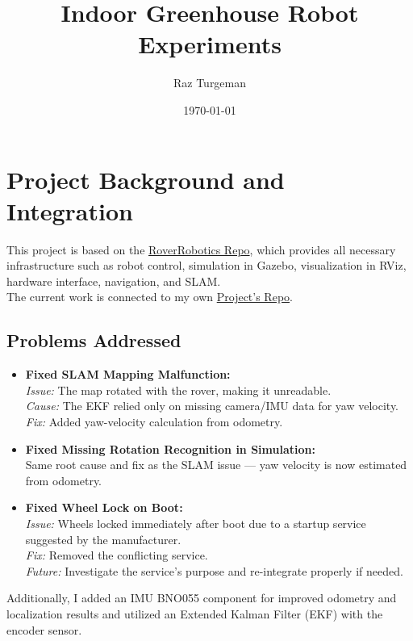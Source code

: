 \documentclass[11pt]{article}
\title{Indoor Greenhouse Robot Experiments}
\author{Raz Turgeman}
\date{\today}
\begin{document}
\maketitle

\section{Project Background and Integration}

This project is based on the \href{https://github.com/RoverRobotics/roverrobotics_ros2/tree/humble}{RoverRobotics Repo}, which provides all necessary infrastructure such as robot control, simulation in Gazebo, visualization in RViz, hardware interface, navigation, and SLAM. \\
The current work is connected to my own \href{https://github.com/RazTurgeman97/rover_volkani/tree/main}{Project's Repo}.

\subsection{Problems Addressed}
\begin{itemize}
    \item \textbf{Fixed SLAM Mapping Malfunction:} \\
    \textit{Issue:} The map rotated with the rover, making it unreadable. \\
    \textit{Cause:} The EKF relied only on missing camera/IMU data for yaw velocity. \\
    \textit{Fix:} Added yaw-velocity calculation from odometry. \\
    \item \textbf{Fixed Missing Rotation Recognition in Simulation:} \\
    Same root cause and fix as the SLAM issue — yaw velocity is now estimated from odometry.
    \item \textbf{Fixed Wheel Lock on Boot:} \\
    \textit{Issue:} Wheels locked immediately after boot due to a startup service suggested by the manufacturer. \\
    \textit{Fix:} Removed the conflicting service. \\
    \textit{Future:} Investigate the service’s purpose and re-integrate properly if needed.
\end{itemize}
Additionally, I added an IMU BNO055 component for improved odometry and localization results and utilized an Extended Kalman Filter (EKF) with the encoder sensor.
\end{document}

